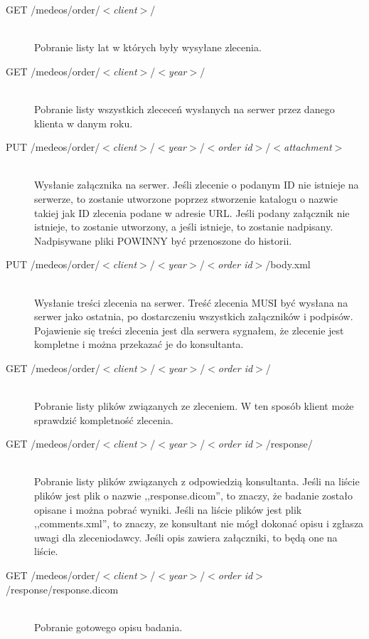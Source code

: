 \documentclass[a4paper]{article}
\begin{document}
\begin{description}
  \item[GET /medeos/order/$<$\emph{client}$>$/]  \hfill \\
  Pobranie listy lat w których były wysyłane zlecenia.
  \item[GET /medeos/order/$<$\emph{client}$>$/$<$\emph{year}$>$/]  \hfill \\
  Pobranie listy wszystkich zlececeń wysłanych na serwer przez danego klienta w danym
  roku.
  \item[PUT /medeos/order/$<$\emph{client}$>$/$<$\emph{year}$>$/$<$\emph{order id}$>$/$<$\emph{attachment}$>$] \hfill \\ 
  Wysłanie załącznika na serwer. Jeśli
  zlecenie o podanym ID nie istnieje na serwerze, to zostanie utworzone poprzez
  stworzenie katalogu o nazwie takiej jak ID zlecenia podane w adresie URL. Jeśli podany
  załącznik nie istnieje, to zostanie utworzony, a jeśli istnieje, to zostanie
  nadpisany. Nadpisywane pliki POWINNY być przenoszone do historii.
  \item[PUT /medeos/order/$<$\emph{client}$>$/$<$\emph{year}$>$/$<$\emph{order id}$>$/body.xml] \hfill \\ 
  Wysłanie treści zlecenia na serwer. Treść zlecenia MUSI być
  wysłana na serwer jako ostatnia, po dostarczeniu wszystkich załączników i podpisów. Pojawienie się treści
  zlecenia jest dla serwera sygnałem, że zlecenie jest kompletne i można przekazać je do
  konsultanta. 
  \item[GET /medeos/order/$<$\emph{client}$>$/$<$\emph{year}$>$/$<$\emph{order id}$>$/]  \hfill \\
  Pobranie listy plików związanych ze zleceniem. W ten sposób klient może sprawdzić
  kompletność zlecenia.
  \item[GET /medeos/order/$<$\emph{client}$>$/$<$\emph{year}$>$/$<$\emph{order id}$>$/response/]  
  \hfill \\
  Pobranie listy plików związanych z odpowiedzią konsultanta. Jeśli na liście plików jest
  plik o nazwie ,,response.dicom'', to znaczy, że badanie zostało opisane i można pobrać wyniki.
  Jeśli na liście plików jest plik ,,comments.xml'', to znaczy, ze konsultant nie mógł dokonać
  opisu i zgłasza uwagi dla zleceniodawcy. Jeśli opis zawiera załączniki, to będą one na
  liście.
  \item[GET /medeos/order/$<$\emph{client}$>$/$<$\emph{year}$>$/$<$\emph{order id}$>$/response/response.dicom] 
  \hfill \\ Pobranie gotowego opisu badania.

\end{description}
\end{document}
